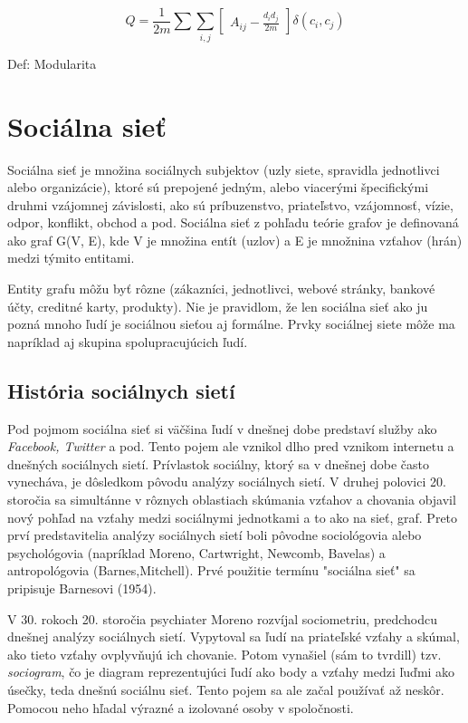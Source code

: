 \documentclass[slovak,master,public,dept460,male,cpdeclaration,oneside]{diploma}
\begin{document}
\begin{mycapequ}[!ht]
      \begin{equation*}    
{
Q = \frac{1}{2m}\sum \sum_{i,j}\begin{bmatrix}
A_{ij} - \frac{d_{i}d_{j}}{2m}
\end{bmatrix} \delta (c_{i}, c_{j})
}
   \end{equation*}
   \caption{Def: Modularita}
\end{mycapequ}


\section{Sociálna sieť}

Sociálna sieť je množina sociálnych subjektov (uzly siete, spravidla jednotlivci alebo organizácie),
ktoré sú prepojené jedným, alebo viacerými špecifickými druhmi vzájomnej závislosti, ako sú príbuzenstvo, priateľstvo, vzájomnosť, vízie, odpor, konflikt, obchod a pod.
Sociálna sieť z pohľadu teórie grafov je definovaná ako graf G(V, E), kde V je množina entít
(uzlov) a E je množnina vzťahov (hrán) medzi týmito entitami.

Entity grafu môžu byť rôzne (zákazníci, jednotlivci, webové stránky, bankové účty, creditné karty,
produkty). Nie je pravidlom, že len sociálna sieť ako ju pozná mnoho ľudí je sociálnou sieťou aj formálne. Prvky sociálnej siete môže ma napríklad aj skupina spolupracujúcich ľudí. 

\subsection{História sociálnych sietí}

Pod pojmom sociálna sieť si väčšina ľudí v dnešnej dobe predstaví služby ako \textit{Facebook, Twitter} a pod. Tento pojem ale vznikol dlho pred vznikom internetu a dnešných sociálnych sietí. Prívlastok sociálny, ktorý sa v dnešnej dobe často vynecháva, je dôsledkom pôvodu analýzy sociálnych sietí. V druhej polovici 20. storočia sa simultánne v rôznych oblastiach skúmania vzťahov a chovania objavil nový pohľad na vzťahy medzi sociálnymi jednotkami a to ako na sieť, graf. Preto prví predstavitelia analýzy sociálnych sietí boli pôvodne sociológovia alebo psychológovia (napríklad Moreno, Cartwright, Newcomb, Bavelas) a antropológovia (Barnes,Mitchell). Prvé použitie termínu "sociálna sieť" sa pripisuje Barnesovi (1954).

V 30. rokoch 20. storočia psychiater Moreno rozvíjal sociometriu, predchodcu dnešnej analýzy sociálnych sietí. Vypytoval sa ľudí na priateľské vzťahy a skúmal, ako tieto vzťahy ovplyvňujú ich chovanie. Potom vynašiel (sám to tvrdill) tzv. \textit{sociogram}, čo je diagram reprezentujúci ľudí ako body a vzťahy medzi ľuďmi ako úsečky, teda dnešnú sociálnu sieť. Tento pojem sa ale začal používať až neskôr. Pomocou neho hľadal výrazné a izolované osoby v spoločnosti.
\end{document}
